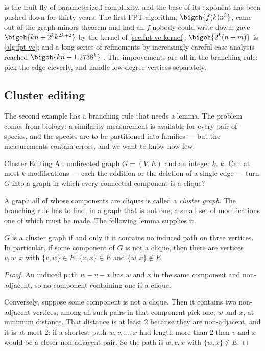 \begin{remark}\label{rem:fpt-vc-history}
 is the fruit fly of parameterized complexity, and the base
of its exponent has been pushed down for thirty years. The first
$\mathrm{FPT}$ algorithm, $\bigoh{f(k)n^3}$, came out of the graph minors
theorem and had an $f$ nobody could write down; \citet{BussGoldsmith1993} gave
$\bigoh{kn + 2^kk^{2k+2}}$ by the kernel of \cref{sec:fpt-vc-kernel};
$\bigoh{2^k(n+m)}$ is \cref{alg:fpt-vc}; and a long series of refinements by
increasingly careful case analysis reached $\bigoh{kn + 1.2738^k}$
\citep{ChenKanjXia2010}. The improvements are all in the branching rule: pick
the edge cleverly, and handle low-degree vertices separately.
\end{remark}

\subsection{Cluster editing}

The second example has a branching rule that needs a lemma. The problem comes
from biology: a similarity measurement is available for every pair of species,
and the species are to be partitioned into families --- but the measurements
contain errors, and we want to know how few.

\begin{probdef}{Cluster Editing}
  \instance An undirected graph $G = (V,E)$ and an integer $k$.
  \parameter $k$.
  \question Can at most $k$ modifications --- each the addition or the deletion
  of a single edge --- turn $G$ into a graph in which every connected component
  is a clique?
\end{probdef}

A graph all of whose components are cliques is called a \emph{cluster graph}.
The branching rule has to find, in a graph that is not one, a small set of
modifications one of which must be made. The following lemma supplies it.

\begin{lemma}\label{lem:cluster-p3}
$G$ is a cluster graph if and only if it contains no induced path on three
vertices. In particular, if some component of $G$ is not a clique, then there
are vertices $v,w,x$ with $\{v,w\} \in E$, $\{v,x\} \in E$ and
$\{w,x\} \notin E$.
\end{lemma}

\begin{proof}
An induced path $w - v - x$ has $w$ and $x$ in the same component and
non-adjacent, so no component containing one is a clique.

Conversely, suppose some component is not a clique. Then it contains two
non-adjacent vertices; among all such pairs in that component pick one, $w$ and
$x$, at minimum distance. That distance is at least $2$ because they are
non-adjacent, and it is at most $2$: if a shortest path $w, v, \ldots, x$ had
length more than $2$ then $v$ and $x$ would be a closer non-adjacent pair. So
the path is $w, v, x$ with $\{w,x\} \notin E$.
\end{proof}

